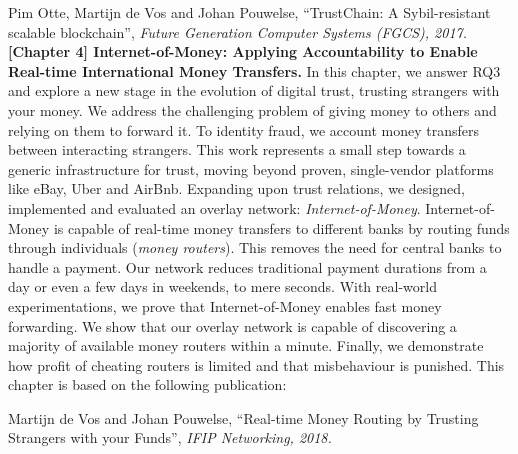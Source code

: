 Pim Otte, Martijn de Vos and Johan Pouwelse, \enquote{TrustChain: A Sybil-resistant scalable blockchain}, \emph{Future Generation Computer Systems (FGCS), 2017.}\\

\textbf{[Chapter 4] Internet-of-Money: Applying Accountability to Enable Real-time International Money Transfers.}
In this chapter, we answer RQ3 and explore a new stage in the evolution of digital trust, trusting strangers with your money.
We address the challenging problem of giving money to others and relying on them to forward it.
To identity fraud, we account money transfers between interacting strangers.
This work represents a small step towards a generic infrastructure for trust, moving beyond proven, single-vendor platforms like eBay, Uber and AirBnb.
Expanding upon trust relations, we designed, implemented and evaluated an overlay network: \emph{Internet-of-Money}.
Internet-of-Money is capable of real-time money transfers to different banks by routing funds through individuals (\emph{money routers}).
This removes the need for central banks to handle a payment.
Our network reduces traditional payment durations from a day or even a few days in weekends, to mere seconds.
With real-world experimentations, we prove that Internet-of-Money enables fast money forwarding.
We show that our overlay network is capable of discovering a majority of available money routers within a minute.
Finally, we demonstrate how profit of cheating routers is limited and that misbehaviour is punished.
This chapter is based on the following publication:

Martijn de Vos and Johan Pouwelse, \enquote{Real-time Money Routing by Trusting Strangers with your Funds}, \emph{IFIP Networking, 2018.}\\

